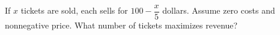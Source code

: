 If $ x $ tickets are sold, each sells for $ 100-\dfrac{x}{5}$ dollars. Assume zero costs and nonnegative price. What number of tickets maximizes revenue?
